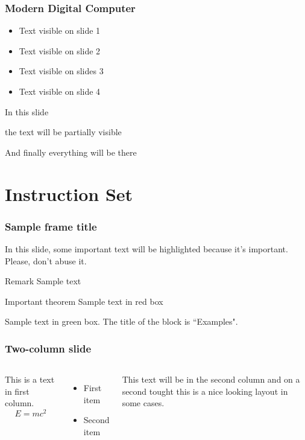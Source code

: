 \documentclass{beamer}
\begin{document}
\begin{frame}
\frametitle{Modern Digital Computer}
\begin{itemize}
    \item<1-> Text visible on slide 1
    \item<2-> Text visible on slide 2
    \item<3> Text visible on slides 3
    \item<4-> Text visible on slide 4
\end{itemize}
\end{frame}

\begin{frame}
In this slide \pause

the text will be partially visible \pause

And finally everything will be there
\end{frame}

\section{Instruction Set}

\begin{frame}
\frametitle{Sample frame title}

In this slide, some important text will be
\alert{highlighted} because it's important.
Please, don't abuse it.

\begin{block}{Remark}
Sample text
\end{block}

\begin{alertblock}{Important theorem}
Sample text in red box
\end{alertblock}

\begin{examples}
Sample text in green box. The title of the block is ``Examples".
\end{examples}
\end{frame}


\begin{frame}
\frametitle{Two-column slide}

\begin{columns}

This is a text in first column.
$$E=mc^2$$
\begin{itemize}
\item First item
\item Second item
\end{itemize}

This text will be in the second column
and on a second tought this is a nice looking
layout in some cases.
\end{columns}
\end{frame}
\end{document}
